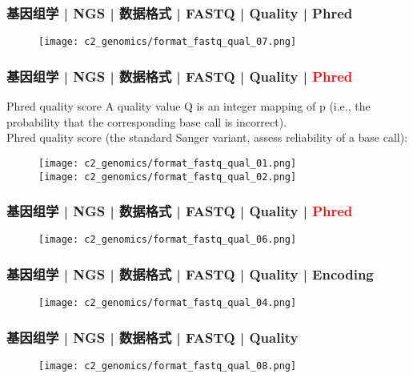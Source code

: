 \begin{frame}
  \frametitle{基因组学 | NGS | 数据格式 | FASTQ | Quality | Phred}
  \begin{figure}
    \centering
    \texttt{[image: c2\_genomics/format\_fastq\_qual\_07.png]}
  \end{figure}
\end{frame}
    
\begin{frame}
  \frametitle{基因组学 | NGS | 数据格式 | FASTQ | Quality | \textcolor{red}{Phred}}
  \begin{block}{Phred quality score}
A quality value Q is an integer mapping of p (i.e., the probability that the corresponding base call is incorrect).\\
\vspace{1em}
Phred quality score (the standard Sanger variant, assess reliability of a base call): 
  \end{block}
  \begin{figure}
    \centering
    \texttt{[image: c2\_genomics/format\_fastq\_qual\_01.png]}\\
    \vspace{1em}
    \texttt{[image: c2\_genomics/format\_fastq\_qual\_02.png]}
  \end{figure}
\end{frame}

\begin{frame}
  \frametitle{基因组学 | NGS | 数据格式 | FASTQ | Quality | \textcolor{red}{Phred}}
  \begin{figure}
    \centering
    \texttt{[image: c2\_genomics/format\_fastq\_qual\_06.png]}
  \end{figure}
\end{frame}
    
\begin{frame}
  \frametitle{基因组学 | NGS | 数据格式 | FASTQ | Quality | Encoding}
  \begin{figure}
    \centering
    \texttt{[image: c2\_genomics/format\_fastq\_qual\_04.png]}
  \end{figure}
\end{frame}

\begin{frame}
  \frametitle{基因组学 | NGS | 数据格式 | FASTQ | Quality}
  \begin{figure}
    \centering
    \texttt{[image: c2\_genomics/format\_fastq\_qual\_08.png]}
  \end{figure}
\end{frame}
    
